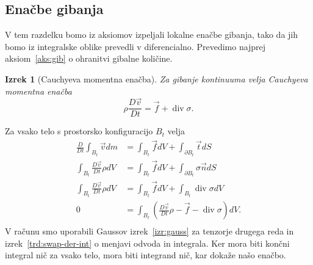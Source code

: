 \documentclass[12pt,a4paper]{article}
\theoremstyle{definition} %
\theoremstyle{plain} %
\newtheorem{izrek}[definicija]{Izrek}
\numberwithin{equation}{section}
\renewcommand{\div}{\operatorname{div}}
\newcommand{\DD}[2]{\ensuremath{\frac{D #1}{D #2}}}
\newcommand{\DDt}[1]{\DD{#1}{t}}
\newcommand{\vv}{\vec{v}}
\newcommand{\vt}{\vec{t}}
\newcommand{\vn}{\vec{n}}
\newcommand{\vf}{\vec{f}}
\newcommand{\ts}{\sigma}
\begin{document}
\subsection{Enačbe gibanja}
V tem razdelku bomo iz aksiomov izpeljali lokalne enačbe gibanja, tako da jih
bomo iz integralske oblike prevedli v diferencialno.
Prevedimo najprej aksiom~\ref{aks:gib} o ohranitvi gibalne količine.
\begin{izrek}[Cauchyeva momentna enačba]
  Za gibanje kontinuuma velja Cauchyeva momentna enačba
  \begin{equation}
    \rho \DDt{\vv} = \vf + \div \sigma.
    \label{eq:cauchy-moment}
  \end{equation}
\end{izrek}
\proof
Za vsako telo s prostorsko konfiguracijo $B_t$ velja
\begin{align*}
  \DDt{} \int_{B_t} \vv dm &= \int_{B_t} \vf dV + \int_{\partial {B_t}} \vt dS \\
  \int_{B_t} \DDt{\vv}\rho dV &= \int_{B_t} \vf dV + \int_{\partial {B_t}} \ts \vn dS \\
  \int_{B_t} \DDt{\vv}\rho dV &= \int_{B_t} \vf dV + \int_{B_t} \div \ts dV \\
  0 &= \int_{B_t}\left(\DDt{\vv}\rho - \vf - \div \ts\right) dV. \\
\end{align*}
V računu smo uporabili Gaussov izrek~\ref{izr:gauss} za tenzorje drugega reda in
izrek~\ref{trd:swap-der-int} o menjavi odvoda in integrala. Ker mora biti končni
integral nič za vsako telo, mora biti integrand nič, kar dokaže našo enačbo.
\endproof
\end{document}

